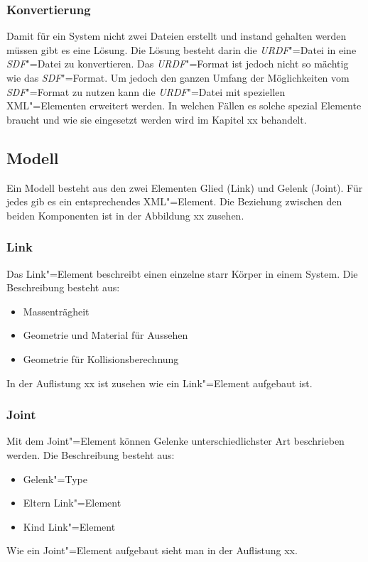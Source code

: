 \subsubsection{Konvertierung}
Damit für ein System nicht zwei Dateien erstellt und instand gehalten werden müssen gibt es eine Lösung.
Die Lösung besteht darin die \textit{URDF}"=Datei in eine \textit{SDF}"=Datei zu konvertieren.
Das \textit{URDF}"=Format ist jedoch nicht so mächtig wie das \textit{SDF}"=Format.
Um jedoch den ganzen Umfang der Möglichkeiten vom \textit{SDF}"=Format zu nutzen kann die \textit{URDF}"=Datei mit speziellen XML"=Elementen erweitert werden.
In welchen Fällen es solche spezial Elemente braucht und wie sie eingesetzt werden wird im Kapitel xx behandelt. %


\subsection{Modell}
Ein Modell besteht aus den zwei Elementen Glied (Link) und Gelenk (Joint).
Für jedes gib es ein entsprechendes XML"=Element.
Die Beziehung zwischen den beiden Komponenten ist in der Abbildung xx zusehen. %


\subsubsection*{Link}
Das Link"=Element beschreibt einen einzelne starr Körper in einem System.
Die Beschreibung besteht aus:
\begin{itemize}
\item Massenträgheit
\item Geometrie und Material für Aussehen
\item Geometrie für Kollisionsberechnung
\end{itemize}
In der Auflistung xx ist zusehen wie ein Link"=Element aufgebaut ist. %

\subsubsection*{Joint}
Mit dem Joint"=Element können Gelenke unterschiedlichster Art beschrieben werden.
Die Beschreibung besteht aus:
\begin{itemize}
\item Gelenk"=Type
\item Eltern Link"=Element
\item Kind Link"=Element
\end{itemize}
Wie ein Joint"=Element aufgebaut sieht man in der Auflistung xx. %


